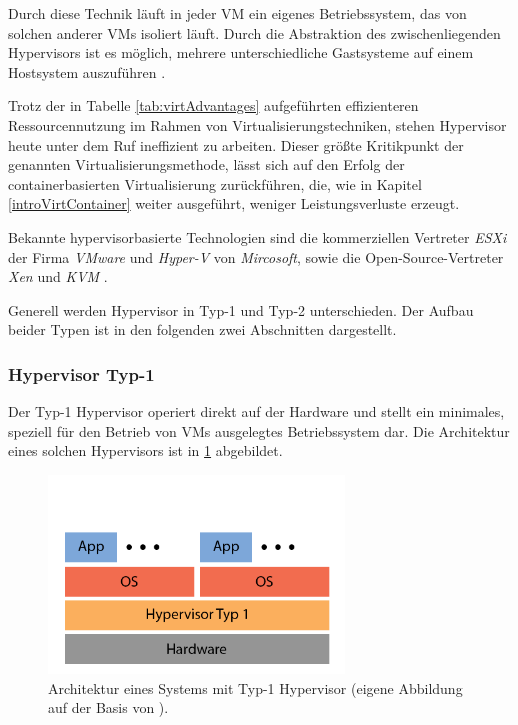 \documentclass[../main.tex]{subfiles}
\begin{document}
      Durch diese Technik läuft in jeder \acrshort{VM} ein eigenes Betriebssystem, das von solchen anderer \acrshort{VM}s isoliert läuft. Durch die Abstraktion des zwischenliegenden Hypervisors ist es möglich, mehrere unterschiedliche Gastsysteme auf einem Hostsystem auszuführen \cite[S.2]{containerVirtPerformance}\cite[S.106]{tanenbaumOS}.

			Trotz der in Tabelle \ref{tab:virtAdvantages} aufgeführten effizienteren Ressourcennutzung im Rahmen von Virtualisierungstechniken, stehen Hypervisor heute unter dem Ruf ineffizient zu arbeiten. Dieser größte Kritikpunkt der genannten Virtualisierungsmethode, lässt sich auf den Erfolg der containerbasierten Virtualisierung zurückführen, die, wie in Kapitel \ref{introVirtContainer} weiter ausgeführt, weniger Leistungsverluste erzeugt.

			Bekannte hypervisorbasierte Technologien sind die kommerziellen Vertreter \emph{ESXi} der Firma \emph{VMware} und \emph{Hyper-V} von \emph{Mircosoft}, sowie die Open-Source-Vertreter \emph{Xen} und \emph{KVM} \cite[S.1]{dockerLXCKub}.

      Generell werden Hypervisor in Typ-1 und Typ-2 unterschieden. Der Aufbau beider Typen ist in den folgenden zwei Abschnitten dargestellt.


			\subsubsection{Hypervisor Typ-1}
				Der Typ-1 Hypervisor operiert direkt auf der Hardware und stellt ein minimales, speziell für den Betrieb von VMs ausgelegtes Betriebssystem dar. Die Architektur eines solchen Hypervisors ist in \fig \ref{fig:intro_hypervisor1} abgebildet.

				\begin{figure}[h]
	          \centering
	          \includegraphics[width=0.7\textwidth]{./images/intro_hypervisor1.png}
	          \caption{Architektur eines Systems mit Typ-1 Hypervisor (eigene Abbildung auf der Basis von \cite[S.107]{tanenbaumOS}).}
	          \label{fig:intro_hypervisor1}
	      \end{figure}
\end{document}
